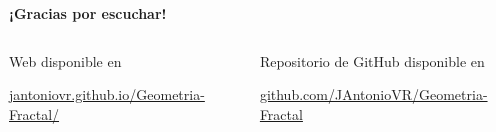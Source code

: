 \begin{frame}{}


\vspace{1cm}

\centering\textbf{{\Huge ¡Gracias por escuchar!}}

\vspace{\fill}

 \begin{columns}[c, onlytextwidth]
        \vspace{0.7cm}
        \begin{center}
        
            
            Web disponible en  
            
            \url{jantoniovr.github.io/Geometria-Fractal/}
            
        \end{center}
        
        
    \hfill
        \begin{center}
            
            
            
            Repositorio de GitHub disponible en 
            
            \url{github.com/JAntonioVR/Geometria-Fractal}
            
        \end{center}
        
  \end{columns}

    
\end{frame}
